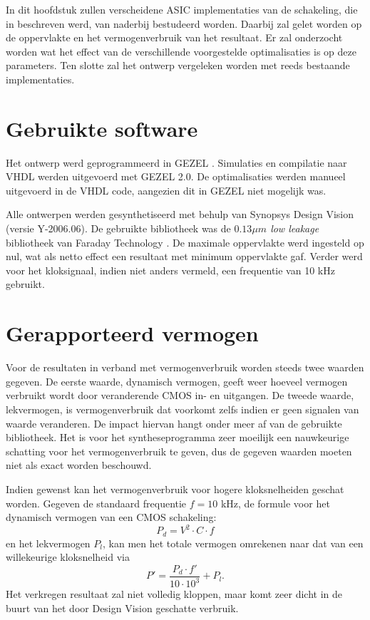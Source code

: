 
In dit hoofdstuk zullen verscheidene ASIC implementaties van de schakeling, die in  beschreven werd, van naderbij bestudeerd worden. Daarbij zal gelet worden op de oppervlakte en het vermogenverbruik van het resultaat. Er zal onderzocht worden wat het effect van de verschillende voorgestelde optimalisaties is op deze parameters. Ten slotte zal het ontwerp vergeleken worden met reeds bestaande implementaties.

\section{Gebruikte software}

Het ontwerp werd geprogrammeerd in GEZEL \cite{gezel}. Simulaties en compilatie naar VHDL werden uitgevoerd met GEZEL 2.0. De optimalisaties werden manueel uitgevoerd in de VHDL code, aangezien dit in GEZEL niet mogelijk was.

Alle ontwerpen werden gesynthetiseerd met behulp van Synopsys Design Vision (versie Y-2006.06). De gebruikte bibliotheek was de \emph{$0.13 \mu m$ low leakage} bibliotheek van Faraday Technology \cite{cell-databook}. De maximale oppervlakte werd ingesteld op nul, wat als netto effect een resultaat met minimum oppervlakte gaf. Verder werd voor het kloksignaal, indien niet anders vermeld, een frequentie van 10 kHz gebruikt.

\section{Gerapporteerd vermogen}

Voor de resultaten in verband met vermogenverbruik worden steeds twee waarden gegeven. De eerste waarde, dynamisch vermogen, geeft weer hoeveel vermogen verbruikt wordt door veranderende CMOS in- en uitgangen. De tweede waarde, lekvermogen, is vermogenverbruik dat voorkomt zelfs indien er geen signalen van waarde veranderen. De impact hiervan hangt onder meer af van de gebruikte bibliotheek. Het is voor het syntheseprogramma zeer moeilijk een nauwkeurige schatting voor het vermogenverbruik te geven, dus de gegeven waarden moeten niet als exact worden beschouwd.

Indien gewenst kan het vermogenverbruik voor hogere kloksnelheiden geschat worden. Gegeven de standaard frequentie $f = 10$ kHz, de formule voor het dynamisch vermogen van een CMOS schakeling:
\[P_d = V^2 \cdot C \cdot f\]
en het lekvermogen $P_l$, kan men het totale vermogen omrekenen naar dat van een willekeurige kloksnelheid via
\[P' = \frac{P_d \cdot f'}{10 \cdot 10^3} + P_l.\]
Het verkregen resultaat zal niet volledig kloppen, maar komt zeer dicht in de buurt van het door Design Vision geschatte verbruik.


